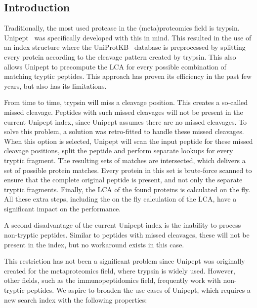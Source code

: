 \documentclass[11pt]{article}
\begin{document}
    \begin{multicols}{2}
        \section{Introduction}\label{sec:introduction}
        Traditionally, the most used protease in the (meta)proteomics field is trypsin.
        Unipept~\cite{unipept_desktop, unipept_api, unipept_4, unipept_orig, unipept_tutorial, unipept_web, unipept_cli, unipept_desktop_2} was specifically developed with this in mind.
        This resulted in the use of an index structure where the UniProtKB~\cite{UniprotKB} database is preprocessed by splitting every protein according to the cleavage pattern created by trypsin.
        This also allows Unipept to precompute the LCA for every possible combination of matching tryptic peptides.
        This approach has proven its efficiency in the past few years, but also has its limitations.

        From time to time, trypsin will miss a cleavage position.
        This creates a so-called missed cleavage.
        Peptides with such missed cleavages will not be present in the current Unipept index, since Unipept assumes there are no missed cleavages.
        To solve this problem, a solution was retro-fitted to handle these missed cleavages.
        When this option is selected, Unipept will scan the input peptide for these missed cleavage positions, split the peptide and perform separate lookups for every tryptic fragment.
        The resulting sets of matches are intersected, which delivers a set of possible protein matches.
        Every protein in this set is brute-force scanned to ensure that the complete original peptide is present, and not only the separate tryptic fragments.
        Finally, the LCA of the found proteins is calculated on the fly.
        All these extra steps, including the on the fly calculation of the LCA, have a significant impact on the performance.

        A second disadvantage of the current Unipept index is the inability to process non-tryptic peptides.
        Similar to peptides with missed cleavages, these will not be present in the index, but no workaround exists in this case.

        This restriction has not been a significant problem since Unipept was originally created for the metaproteomics field, where trypsin is widely used.
        However, other fields, such as the immunopeptidomics field, frequently work with non-tryptic peptides.
        We aspire to broaden the use cases of Unipept, which requires a new search index with the following properties:


\end{multicols}
\end{document}
